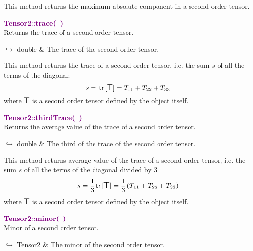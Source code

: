 This method returns the maximum absolute component in a second order tensor.

\textcolor{purple}{\textbf{Tensor2::trace(~)}}\label{Tensor2::trace()}\\
Returns the trace of a second order tensor.\vspace*{-0.5em}
\begin{tcolorbox}[grow to left by=-1cm, width=\textwidth-1cm,myArgs,tabularx={l|R}]
$\hookrightarrow$ double & The trace of the second order tensor.
\end{tcolorbox}

This method returns the trace of a second order tensor, i.e. the sum $s$ of all the terms of the diagonal:
\begin{equation*}
s = \mbox{\ensuremath{\mathsf{\,tr\,}}}[\mbox{\large\ensuremath{\mathsf{T}}}] = T_{11}+T_{22}+T_{33}
\end{equation*}
where $\mbox{\large\ensuremath{\mathsf{T}}}$ is a second order tensor defined by the object itself.

\textcolor{purple}{\textbf{Tensor2::thirdTrace(~)}}\label{Tensor2::thirdTrace()}\\
Returns the average value of the trace of a second order tensor.\vspace*{-0.5em}
\begin{tcolorbox}[grow to left by=-1cm, width=\textwidth-1cm,myArgs,tabularx={l|R}]
$\hookrightarrow$ double & The third of the trace of the second order tensor.
\end{tcolorbox}

This method returns average value of the trace of a second order tensor, i.e. the sum $s$ of all the terms of the diagonal divided by 3:
\begin{equation*}
s = \frac{1}{3} \mbox{\ensuremath{\mathsf{\,tr\,}}}[\mbox{\large\ensuremath{\mathsf{T}}}] =  \frac{1}{3} \left( T_{11}+T_{22}+T_{33} \right)
\end{equation*}
where $\mbox{\large\ensuremath{\mathsf{T}}}$ is a second order tensor defined by the object itself.

\textcolor{purple}{\textbf{Tensor2::minor(~)}}\label{Tensor2::minor()}\\
Minor of a second order tensor.\vspace*{-0.5em}
\begin{tcolorbox}[grow to left by=-1cm, width=\textwidth-1cm,myArgs,tabularx={l|R}]
$\hookrightarrow$ Tensor2 & The minor of the second order tensor.
\end{tcolorbox}

